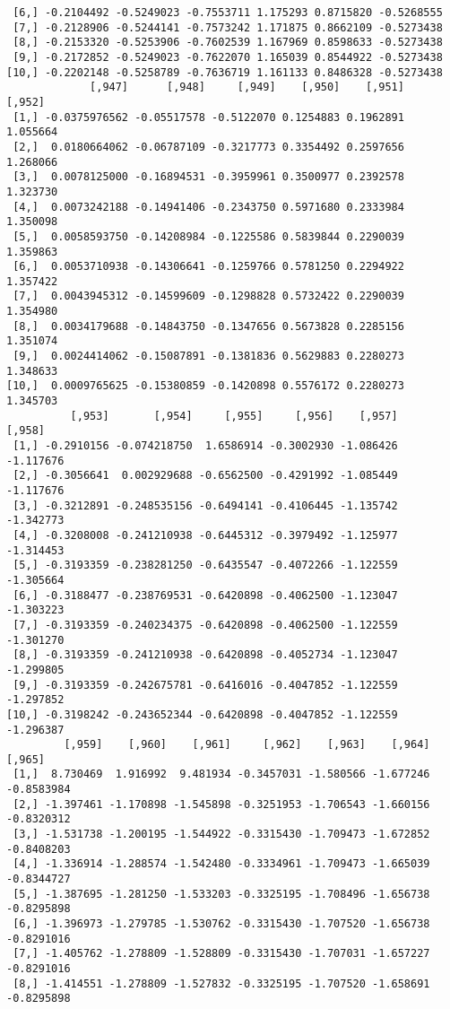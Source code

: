 \documentclass[
  letterpaper,
  DIV=11,
  numbers=noendperiod]{scrreprt}
\begin{document}
\begin{verbatim}
 [6,] -0.2104492 -0.5249023 -0.7553711 1.175293 0.8715820 -0.5268555
 [7,] -0.2128906 -0.5244141 -0.7573242 1.171875 0.8662109 -0.5273438
 [8,] -0.2153320 -0.5253906 -0.7602539 1.167969 0.8598633 -0.5273438
 [9,] -0.2172852 -0.5249023 -0.7622070 1.165039 0.8544922 -0.5273438
[10,] -0.2202148 -0.5258789 -0.7636719 1.161133 0.8486328 -0.5273438
             [,947]      [,948]     [,949]    [,950]    [,951]   [,952]
 [1,] -0.0375976562 -0.05517578 -0.5122070 0.1254883 0.1962891 1.055664
 [2,]  0.0180664062 -0.06787109 -0.3217773 0.3354492 0.2597656 1.268066
 [3,]  0.0078125000 -0.16894531 -0.3959961 0.3500977 0.2392578 1.323730
 [4,]  0.0073242188 -0.14941406 -0.2343750 0.5971680 0.2333984 1.350098
 [5,]  0.0058593750 -0.14208984 -0.1225586 0.5839844 0.2290039 1.359863
 [6,]  0.0053710938 -0.14306641 -0.1259766 0.5781250 0.2294922 1.357422
 [7,]  0.0043945312 -0.14599609 -0.1298828 0.5732422 0.2290039 1.354980
 [8,]  0.0034179688 -0.14843750 -0.1347656 0.5673828 0.2285156 1.351074
 [9,]  0.0024414062 -0.15087891 -0.1381836 0.5629883 0.2280273 1.348633
[10,]  0.0009765625 -0.15380859 -0.1420898 0.5576172 0.2280273 1.345703
          [,953]       [,954]     [,955]     [,956]    [,957]    [,958]
 [1,] -0.2910156 -0.074218750  1.6586914 -0.3002930 -1.086426 -1.117676
 [2,] -0.3056641  0.002929688 -0.6562500 -0.4291992 -1.085449 -1.117676
 [3,] -0.3212891 -0.248535156 -0.6494141 -0.4106445 -1.135742 -1.342773
 [4,] -0.3208008 -0.241210938 -0.6445312 -0.3979492 -1.125977 -1.314453
 [5,] -0.3193359 -0.238281250 -0.6435547 -0.4072266 -1.122559 -1.305664
 [6,] -0.3188477 -0.238769531 -0.6420898 -0.4062500 -1.123047 -1.303223
 [7,] -0.3193359 -0.240234375 -0.6420898 -0.4062500 -1.122559 -1.301270
 [8,] -0.3193359 -0.241210938 -0.6420898 -0.4052734 -1.123047 -1.299805
 [9,] -0.3193359 -0.242675781 -0.6416016 -0.4047852 -1.122559 -1.297852
[10,] -0.3198242 -0.243652344 -0.6420898 -0.4047852 -1.122559 -1.296387
         [,959]    [,960]    [,961]     [,962]    [,963]    [,964]     [,965]
 [1,]  8.730469  1.916992  9.481934 -0.3457031 -1.580566 -1.677246 -0.8583984
 [2,] -1.397461 -1.170898 -1.545898 -0.3251953 -1.706543 -1.660156 -0.8320312
 [3,] -1.531738 -1.200195 -1.544922 -0.3315430 -1.709473 -1.672852 -0.8408203
 [4,] -1.336914 -1.288574 -1.542480 -0.3334961 -1.709473 -1.665039 -0.8344727
 [5,] -1.387695 -1.281250 -1.533203 -0.3325195 -1.708496 -1.656738 -0.8295898
 [6,] -1.396973 -1.279785 -1.530762 -0.3315430 -1.707520 -1.656738 -0.8291016
 [7,] -1.405762 -1.278809 -1.528809 -0.3315430 -1.707031 -1.657227 -0.8291016
 [8,] -1.414551 -1.278809 -1.527832 -0.3325195 -1.707520 -1.658691 -0.8295898

\end{verbatim}
\end{document}
